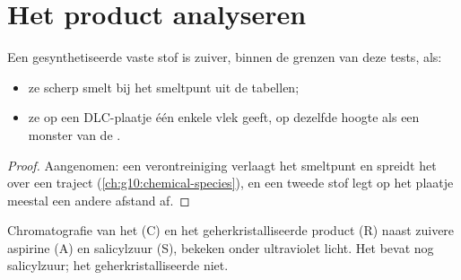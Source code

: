 \section{Het product analyseren}

\begin{proposition}\label{prop:g10:synthesis-yield:checks}
Een gesynthetiseerde vaste stof is zuiver, binnen de grenzen van deze
tests, als:
\begin{itemize}
  \item ze scherp smelt bij het smeltpunt uit de tabellen;
  \item ze op een DLC-plaatje één enkele vlek geeft, op dezelfde hoogte
        als een monster van de .
\end{itemize}
\end{proposition}

\begin{proof}
Aangenomen: een verontreiniging verlaagt het smeltpunt en spreidt het
over een traject (\cref{ch:g10:chemical-species}), en een tweede stof
legt op het plaatje meestal een andere afstand af.
\end{proof}

\begin{omfigure}

{\small Chromatografie van het  (C) en het geherkristalliseerde
product (R) naast zuivere aspirine (A) en salicylzuur (S), bekeken onder
ultraviolet licht. Het  bevat nog salicylzuur; het
geherkristalliseerde niet.}
\end{omfigure}

